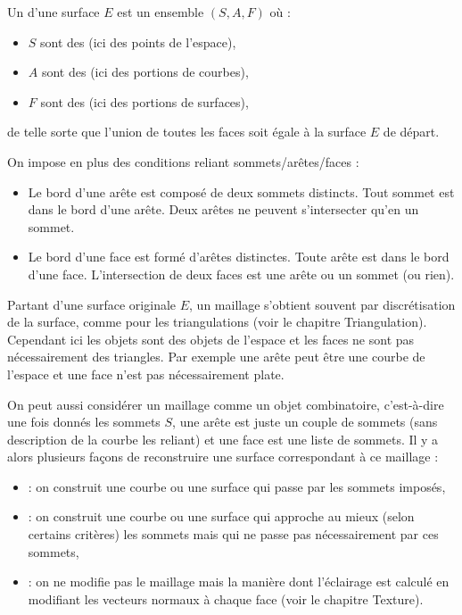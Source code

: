 \documentclass[11pt,class=report,crop=false]{standalone}
\begin{document}
Un  d'une surface $E$ est un ensemble $(S,A,F)$ où :
\begin{itemize}
	\item $S$ sont des   (ici des points de l'espace),
	\item $A$ sont des  (ici des portions de courbes),
	\item $F$ sont des  (ici des portions de surfaces),
\end{itemize}
de telle sorte que l'union de toutes les faces soit égale à la surface $E$ de départ.



On impose en plus des conditions reliant sommets/arêtes/faces :
\begin{itemize}
	\item Le bord d'une arête est composé de deux sommets distincts. Tout sommet est dans le bord d'une arête. Deux arêtes ne peuvent s'intersecter qu'en un sommet.
	
	\item Le bord d'une face est formé d'arêtes distinctes. Toute arête est dans le bord d'une face. L'intersection de deux faces est une arête ou un sommet (ou rien).
\end{itemize}


Partant d'une surface originale $E$, un maillage s'obtient souvent par discrétisation de la surface, comme pour les triangulations (voir le chapitre \og{}Triangulation\fg{}).
Cependant ici les objets sont des objets de l'espace et les faces ne sont pas nécessairement des triangles. Par exemple une arête peut être une courbe de l'espace et une face n'est pas nécessairement plate.


On peut aussi considérer un maillage comme un objet combinatoire, c'est-à-dire une fois donnés les sommets $S$, une arête est juste un couple de sommets (sans description de la courbe les reliant) et une face est une liste de sommets. Il y a alors plusieurs façons de reconstruire une surface correspondant à ce maillage :

\begin{itemize}
	\item {} : on construit une courbe ou une surface qui passe par les sommets imposés,
	
	\item {} : on construit une courbe ou une surface qui approche au mieux (selon certains critères) les sommets mais qui ne passe pas nécessairement par ces sommets,
	
	\item {} : on ne modifie pas le maillage mais la manière dont l'éclairage est calculé en modifiant les vecteurs normaux à chaque face (voir le chapitre \og{}Texture\fg{}).
\end{itemize}	
\end{document}
